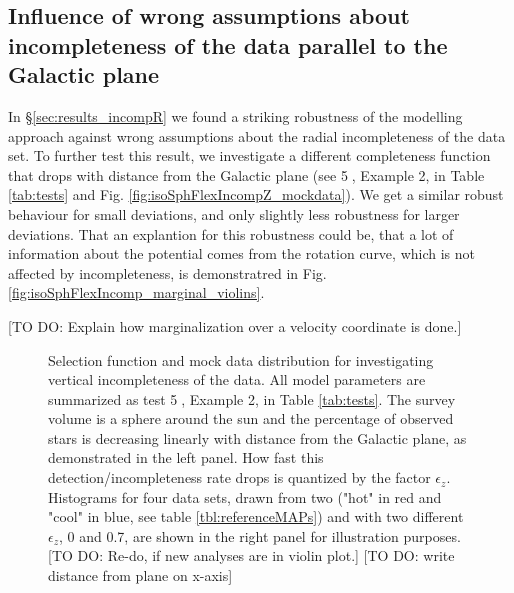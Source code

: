 \subsection{Influence of wrong assumptions about incompleteness of the data parallel to the Galactic plane} \label{sec:incompZ}

In \S\ref{sec:results_incompR} we found a striking robustness of the \RM modelling approach against wrong assumptions about the radial incompleteness of the data set. To further test this result, we investigate a different completeness function that drops with distance from the Galactic plane (see \textcircled{5}, Example 2, in Table \ref{tab:tests} and Fig. \ref{fig:isoSphFlexIncompZ_mockdata}). We get a similar robust behaviour for small deviations, and only slightly less robustness for larger deviations. That an explantion for this robustness could be, that a lot of information about the potential comes from the rotation curve, which is not affected by incompleteness, is demonstratred in Fig. \ref{fig:isoSphFlexIncomp_marginal_violins}.

[TO DO: Explain how marginalization over a velocity coordinate is done.]


\begin{figure}
\caption{Selection function and mock data distribution for investigating vertical incompleteness of the data. All model parameters are summarized as test \textcircled{5}, Example 2, in Table \ref{tab:tests}. The survey volume is a sphere around the sun and the percentage of observed stars is decreasing linearly with distance from the Galactic plane, as demonstrated in the left panel. How fast this detection/incompleteness rate drops is quantized by the factor $\epsilon_z$. Histograms for four data sets, drawn from two \MAPs ("hot" in red and "cool" in blue, see table \ref{tbl:referenceMAPs}) and with two different $\epsilon_z$, 0 and 0.7, are shown in the right panel for illustration purposes. [TO DO: Re-do, if new analyses are in violin plot.] [TO DO: write distance from plane on x-axis]} 
\label{fig:incompZ_mockdata}
\end{figure}


